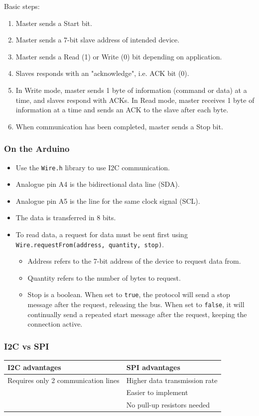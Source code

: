 \documentclass[11pt]{article}
\begin{document}
Basic steps:
\begin{enumerate}
\item Master sends a Start bit.
\item Master sends a 7-bit slave address of intended device.
\item Master sends a Read (1) or Write (0) bit depending on application.
\item Slaves responds with an "acknowledge", i.e. ACK bit (0).
\item In Write mode, master sends 1 byte of information (command or data) at a time, and slaves respond with ACKs. In Read mode, master receives 1 byte of information at a time and sends an ACK to the slave after each byte.
\item When communication has been completed, master sends a Stop bit.
\end{enumerate}

\subsubsection{On the Arduino}
\label{sec:org6a5c3e7}
\begin{itemize}
\item Use the \texttt{Wire.h} library to use I2C communication.
\item Analogue pin A4 is the bidirectional data line (SDA).
\item Analogue pin A5 is the line for the same clock signal (SCL).
\item The data is transferred in 8 bits.
\item To read data, a request for data must be sent first using \texttt{Wire.requestFrom(address, quantity, stop)}.
\begin{itemize}
\item Address refers to the 7-bit address of the device to request data from.
\item Quantity refers to the number of bytes to request.
\item Stop is a boolean. When set to \texttt{true}, the protocol will send a stop message after the request, releasing the bus. When set to \texttt{false}, it will continually send a repeated start message after the request, keeping the connection active.
\end{itemize}
\end{itemize}

\subsubsection{I2C vs SPI}
\label{sec:orgd18870d}
\begin{center}
\begin{tabular}{l|l}
I2C advantages & SPI advantages\\[0pt]
\hline
Requires only 2 communication lines & Higher data transmission rate\\[0pt]
 & Easier to implement\\[0pt]
 & No pull-up resistors needed\\[0pt]
\end{tabular}
\end{center}
\end{document}
